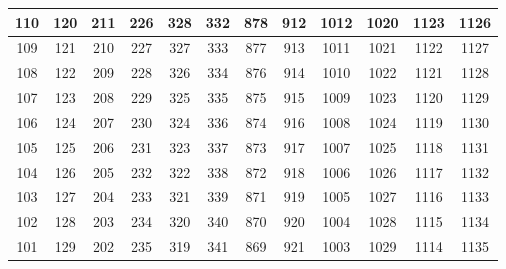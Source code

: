 \begin{center}
{\begin{tabular} {| c | c | c | c | c | c | c | c | c | c | c | c | }
110                      & 120                      &  211 & 226 & 328                      & 332                      & 878 & 912                      & 1012                      & 1020 & 1123                       & 1126                      \\ \hline
109                      & 121                      &  210 & 227 & 327                      & 333                      & 877 & 913                      & 1011                      & 1021 & 1122                       & 1127                      \\ \hline
\cellcolor{red!25}108 & \cellcolor{red!25}122 &  209 & 228 & \cellcolor{red!25}326 & \cellcolor{red!25}334 & 876 & \cellcolor{red!25}914 & \cellcolor{red!25}1010 & 1022 & \cellcolor{red!25}1121  & \cellcolor{red!25}1128 \\ \hline
\cellcolor{red!25}107 & \cellcolor{red!25}123 &  208 & 229 & \cellcolor{red!25}325 & \cellcolor{red!25}335 & 875 & \cellcolor{red!25}915 & \cellcolor{red!25}1009 & 1023 & \cellcolor{red!25}1120  & \cellcolor{red!25}1129 \\ \hline
\cellcolor{red!25}106 & \cellcolor{red!25}124 &  207 & 230 & \cellcolor{red!25}324 & \cellcolor{red!25}336 & 874 & \cellcolor{red!25}916 & \cellcolor{red!25}1008 & 1024 & \cellcolor{red!25}1119  & \cellcolor{red!25}1130 \\ \hline
\cellcolor{red!25}105 & \cellcolor{red!25}125 &  206 & 231 & \cellcolor{red!25}323 & \cellcolor{red!25}337 & 873 & \cellcolor{red!25}917 & \cellcolor{red!25}1007 & 1025 & \cellcolor{red!25}1118  & \cellcolor{red!25}1131 \\ \hline
\cellcolor{red!25}104 & \cellcolor{red!25}126 &  205 & 232 & \cellcolor{red!25}322 & \cellcolor{red!25}338 & 872 & \cellcolor{red!25}918 & \cellcolor{red!25}1006 & 1026 & \cellcolor{red!25}1117  & \cellcolor{red!25}1132 \\ \hline
\cellcolor{red!25}103 & \cellcolor{red!25}127 &  204 & 233 & \cellcolor{red!25}321 & \cellcolor{red!25}339 & 871 & \cellcolor{red!25}919 & \cellcolor{red!25}1005 & 1027 & \cellcolor{red!25}1116  & \cellcolor{red!25}1133 \\ \hline
\cellcolor{red!25}102 & \cellcolor{red!25}128 &  203 & 234 & \cellcolor{red!25}320 & \cellcolor{red!25}340 & 870 & \cellcolor{red!25}920 & \cellcolor{red!25}1004 & 1028 & \cellcolor{red!25}1115  & \cellcolor{red!25}1134 \\ \hline
\cellcolor{red!25}101 & \cellcolor{red!25}129 &  202 & 235 & \cellcolor{red!25}319 & \cellcolor{red!25}341 & 869 & \cellcolor{red!25}921 & \cellcolor{red!25}1003 & 1029 & \cellcolor{red!25}1114  & \cellcolor{red!25}1135 \\ \hline

\end{tabular}}
\end{center}
